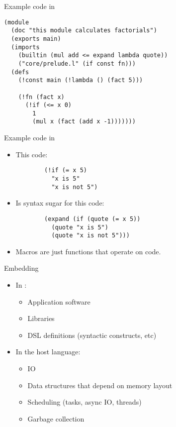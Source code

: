 \begin{frame}[fragile]{Example code in \lang}
\begin{verbatim}
(module
  (doc "this module calculates factorials")
  (exports main)
  (imports
    (builtin (mul add <= expand lambda quote))
    ("core/prelude.l" (if const fn)))
  (defs
    (!const main (!lambda () (fact 5)))

    (!fn (fact x)
      (!if (<= x 0)
        1
        (mul x (fact (add x -1)))))))
\end{verbatim}
\end{frame}

\begin{frame}[fragile]{Example code in \lang}
\begin{itemize}
    \item This code:
      \begin{verbatim}
        (!if (= x 5)
          "x is 5"
          "x is not 5")
      \end{verbatim}
    \item Is syntax sugar for this code:
      \begin{verbatim}
        (expand (if (quote (= x 5))
          (quote "x is 5")
          (quote "x is not 5")))
      \end{verbatim}
    \item Macros are just functions that operate on code.
\end{itemize}
\end{frame}

\begin{frame}[fragile]{Embedding}
\begin{itemize}
    \item In \lang:
        \begin{itemize}
            \item Application software
            \item Libraries
            \item DSL definitions (syntactic constructs, etc)
        \end{itemize}
    \item In the host language:
        \begin{itemize}
            \item IO
            \item Data structures that depend on memory layout
            \item Scheduling (tasks, async IO, threads)
            \item Garbage collection
        \end{itemize}
\end{itemize}
\end{frame}

